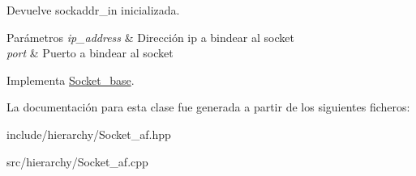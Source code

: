 Devuelve sockaddr\+\_\+in inicializada. 


\begin{DoxyParams}{Parámetros}
{\em ip\+\_\+address} & Dirección ip a bindear al socket \\
\hline
{\em port} & Puerto a bindear al socket \\
\hline
\end{DoxyParams}


Implementa \hyperlink{classSocket__base_a887249ae6a25693230c0febf403a2545}{Socket\+\_\+base}.



La documentación para esta clase fue generada a partir de los siguientes ficheros\+:\begin{DoxyCompactItemize}
\item 
include/hierarchy/Socket\+\_\+af.\+hpp\item 
src/hierarchy/Socket\+\_\+af.\+cpp\end{DoxyCompactItemize}
